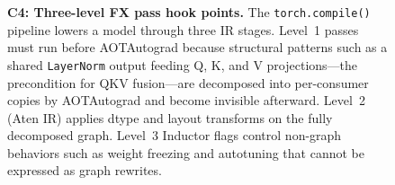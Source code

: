 \begin{figure}[H]
\begin{tikzpicture}
\end{tikzpicture}
\caption{\textbf{C4: Three-level FX pass hook points.}
  The \texttt{torch.compile()} pipeline lowers a model through three IR stages.
  Level~1 passes must run before AOTAutograd because structural patterns such as
  a shared \texttt{LayerNorm} output feeding Q, K, and V projections---the
  precondition for QKV fusion---are decomposed into per-consumer copies by
  AOTAutograd and become invisible afterward.  Level~2 (Aten IR) applies
  dtype and layout transforms on the fully decomposed graph.  Level~3
  Inductor flags control non-graph behaviors such as weight freezing and
  autotuning that cannot be expressed as graph rewrites.}
\label{fig:cand:fxlevel}
\end{figure}


